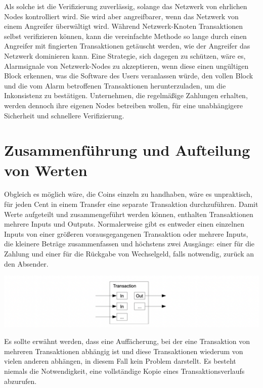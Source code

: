 \documentclass[10pt]{article}
\begin{document}
	Als solche ist die Verifizierung zuverlässig, solange das Netzwerk von ehrlichen Nodes kontrolliert wird. Sie wird aber angreifbarer, wenn das Netzwerk von einem Angreifer überwältigt wird. Während Netzwerk-Knoten Transaktionen selbst verifizieren können, kann die vereinfachte Methode so lange durch einen Angreifer mit fingierten Transaktionen getäuscht werden, wie der Angreifer das Netzwerk dominieren kann. Eine Strategie, sich dagegen zu schützen, wäre es, Alarmsignale von Netzwerk-Nodes zu akzeptieren, wenn diese einen ungültigen Block erkennen, was die Software des Users veranlassen würde, den vollen Block und die vom Alarm betroffenen Transaktionen herunterzuladen, um die Inkonsistenz zu bestätigen. Unternehmen, die regelmäßige Zahlungen erhalten, werden dennoch ihre eigenen Nodes betreiben wollen, für eine unabhängigere Sicherheit und schnellere Verifizierung.

	\section{Zusammenführung und Aufteilung von Werten}
	
	Obgleich es möglich wäre, die Coins einzeln zu handhaben, wäre es unpraktisch, für jeden Cent in einem Transfer eine separate Transaktion durchzuführen. Damit Werte aufgeteilt und zusammengeführt werden können, enthalten Transaktionen mehrere Inputs und Outputs. Normalerweise gibt es entweder einen einzelnen Inputs von einer größeren vorausgegangenen Transaktion oder mehrere Inputs, die kleinere Beträge zusammenfassen und höchstens zwei Ausgänge: einer für die Zahlung und einer für die Rückgabe von Wechselgeld, falls notwendig, zurück an den Absender.
	
	\begin{center}
		\includegraphics[scale=0.4]{pics/combineandsplit.png}
	\end{center}
	
	Es sollte erwähnt werden, dass eine Auffächerung, bei der eine Transaktion von mehreren Transaktionen abhängig ist und diese Transaktionen wiederum von vielen anderen abhängen, in diesem Fall kein Problem darstellt. Es besteht niemals die Notwendigkeit, eine vollständige Kopie eines Transaktionsverlaufs abzurufen.
	
\end{document}
